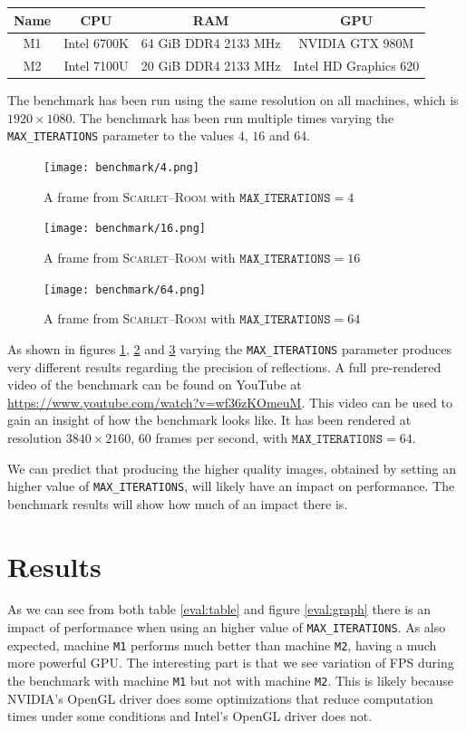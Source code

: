 \documentclass[11pt,a4paper]{report}
\begin{document}
\begin{center}
	\begin{tabular}{ | c | c | c | c | } \hline
		Name & CPU & RAM & GPU \\ \hline
		M1 & Intel 6700K & 64 GiB DDR4 2133 MHz & NVIDIA GTX 980M \\
		M2 & Intel 7100U & 20 GiB DDR4 2133 MHz & Intel HD Graphics 620 \\
		\hline \end{tabular}
\end{center}

The benchmark has been run using the same resolution on all machines, which is $1920 \times 1080$. The benchmark has been run multiple times varying the \texttt{MAX\_ITERATIONS} parameter to the values $4$, $16$ and $64$.

\begin{figure}[htp]
	\centering
	\texttt{[image: benchmark/4.png]}
	\caption{A frame from \textsc{Scarlet--Room} with $\texttt{MAX\_ITERATIONS} = 4$}
	\label{eval:4}
\end{figure}

\begin{figure}[htp]
	\centering
	\texttt{[image: benchmark/16.png]}
	\caption{A frame from \textsc{Scarlet--Room} with $\texttt{MAX\_ITERATIONS} = 16$}
	\label{eval:16}
\end{figure}

\begin{figure}[htp]
	\centering
	\texttt{[image: benchmark/64.png]}
	\caption{A frame from \textsc{Scarlet--Room} with $\texttt{MAX\_ITERATIONS} = 64$}
	\label{eval:64}
\end{figure}

As shown in figures \ref{eval:4}, \ref{eval:16} and \ref{eval:64} varying the \texttt{MAX\_ITERATIONS} parameter produces very different results regarding the precision of reflections. A full pre-rendered video of the benchmark can be found on YouTube at \url{https://www.youtube.com/watch?v=wf36zKOmeuM}. This video can be used to gain an insight of how the benchmark looks like. It has been rendered at resolution $3840 \times 2160$, 60 frames per second, with $\texttt{MAX\_ITERATIONS} = 64$.

We can predict that producing the higher quality images, obtained by setting an higher value of \texttt{MAX\_ITERATIONS}, will likely have an impact on performance. The benchmark results will show how much of an impact there is.

\section{Results}
As we can see from both table \ref{eval:table} and figure \ref{eval:graph} there is an impact of performance when using an higher value of \texttt{MAX\_ITERATIONS}. As also expected, machine \texttt{M1} performs much better than machine \texttt{M2}, having a much more powerful GPU. The interesting part is that we see variation of FPS during the benchmark with machine \texttt{M1} but not with machine \texttt{M2}. This is likely because NVIDIA's OpenGL driver does some optimizations that reduce computation times under some conditions and Intel's OpenGL driver does not.
\end{document}
